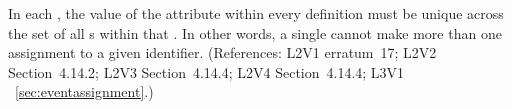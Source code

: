 In each \Event, the value of the  attribute
within every \EventAssignment definition must be unique across the set of
all \EventAssignment{}s within that \Event.  In other words, a
single \Event cannot make more than one assignment to a given
identifier.  (References: L2V1 erratum~17; L2V2 Section~4.14.2;
L2V3 Section~4.14.4; L2V4 Section~4.14.4; L3V1 ~\ref{sec:eventassignment}.)
